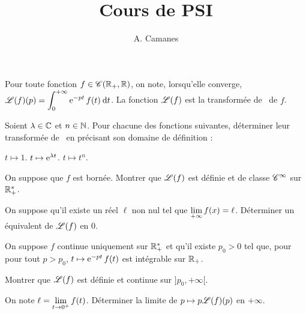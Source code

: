\documentclass[oneside,11pt]{book}
\begin{document}
\title{Cours de PSI}
\author{A. Camanes}
\date{\anneescolaire}
\frontmatter
\renewcommand{\labelitemi}{$\ast$}
\renewcommand{\labelitemii}{$\star$}
\renewcommand{\theenumi}{$(\roman{enumi})$}

\setcounter{exercice}{22}


\begin{exercice}
Pour toute fonction $f \in \mathscr{C}(\mathbb{R}_+,\mathbb{R})$, on note, lorsqu'elle converge, $\mathscr{L}(f)(p) = \displaystyle \int_0^{+\infty} \operatorname{e}^{-p t} f(t) \:{\text d}t$. La fonction $\mathscr{L}(f)$ est la transformée de~\cite{Laplace} de $f$.

\qu Soient $\lambda \in \mathbb{C}$ et $n \in \mathbb{N}$. Pour chacune des fonctions suivantes, déterminer leur transformée de~\cite{Laplace} en précisant son domaine de définition :
\begin{colonnes}{3}
\squ $t \mapsto 1$.
\squ $t \mapsto \operatorname{e}^{\lambda t}$.
\squ $t \mapsto t^n$.
\end{colonnes}

\qu On suppose que $f$ est bornée. Montrer que $\mathscr{L}(f)$ est définie et de classe $\mathscr{C}^\infty$ sur $\mathbb{R}_+^*$.

\qu {} On suppose qu'il existe un réel $\ell$ non nul tel que $\lim\limits_{+\infty} f(x) = \ell$. Déterminer un équivalent de $\mathscr{L}(f)$ en $0$.

\medskip
On suppose $f$ continue uniquement sur $\mathbb{R}_+^*$ et qu'il existe $p_0 > 0$ tel que, pour pour tout $p > p_0$, $t \mapsto \operatorname{e}^{-p t} f(t)$ est intégrable sur $\mathbb{R}_+$. 

\qu Montrer que $\mathscr{L}(f)$ est définie et continue sur $]p_0,+\infty[$.

\qu {} On note $\ell = \lim\limits_{t\to0^+} f(t)$. Déterminer la limite de $p \mapsto p \mathscr{L}(f)(p)$ en $+\infty$.
\end{exercice}
\end{document}
